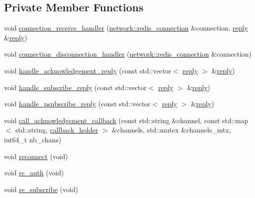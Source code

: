\subsection*{Private Member Functions}
\begin{DoxyCompactItemize}
\item 
void \hyperlink{classcpp__redis_1_1subscriber_ad37cdd903672a0daa395cc3624c50ecb}{connection\+\_\+receive\+\_\+handler} (\hyperlink{classcpp__redis_1_1network_1_1redis__connection}{network\+::redis\+\_\+connection} \&connection, \hyperlink{classcpp__redis_1_1reply}{reply} \&\hyperlink{classcpp__redis_1_1reply}{reply})
\item 
void \hyperlink{classcpp__redis_1_1subscriber_a344918efce6fc6f628e13c8eceeade3a}{connection\+\_\+disconnection\+\_\+handler} (\hyperlink{classcpp__redis_1_1network_1_1redis__connection}{network\+::redis\+\_\+connection} \&connection)
\item 
void \hyperlink{classcpp__redis_1_1subscriber_ade918ef2347138492fe213450f27bcfd}{handle\+\_\+acknowledgement\+\_\+reply} (const std\+::vector$<$ \hyperlink{classcpp__redis_1_1reply}{reply} $>$ \&\hyperlink{classcpp__redis_1_1reply}{reply})
\item 
void \hyperlink{classcpp__redis_1_1subscriber_a9b8e9e1dc12493703c02f2c832bd20d9}{handle\+\_\+subscribe\+\_\+reply} (const std\+::vector$<$ \hyperlink{classcpp__redis_1_1reply}{reply} $>$ \&\hyperlink{classcpp__redis_1_1reply}{reply})
\item 
void \hyperlink{classcpp__redis_1_1subscriber_a6e67df5af6170ad55e77082f18f63d76}{handle\+\_\+psubscribe\+\_\+reply} (const std\+::vector$<$ \hyperlink{classcpp__redis_1_1reply}{reply} $>$ \&\hyperlink{classcpp__redis_1_1reply}{reply})
\item 
void \hyperlink{classcpp__redis_1_1subscriber_a8cbe2790b1e0f803f41a403ed8c66513}{call\+\_\+acknowledgement\+\_\+callback} (const std\+::string \&channel, const std\+::map$<$ std\+::string, \hyperlink{structcpp__redis_1_1subscriber_1_1callback__holder}{callback\+\_\+holder} $>$ \&channels, std\+::mutex \&channels\+\_\+mtx, int64\+\_\+t nb\+\_\+chans)
\item 
void \hyperlink{classcpp__redis_1_1subscriber_a0d5c27ee74e5422d07ce14677ae0e23b}{reconnect} (void)
\item 
void \hyperlink{classcpp__redis_1_1subscriber_acb33b48b9dfa03b4a5b60cc832b57259}{re\+\_\+auth} (void)
\item 
void \hyperlink{classcpp__redis_1_1subscriber_ac38ffc11fb8e67159a7ffa924a6bb8a6}{re\+\_\+subscribe} (void)

\end{DoxyCompactItemize}
